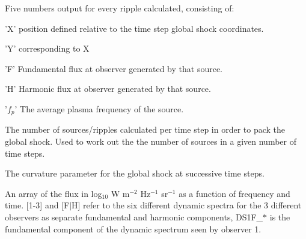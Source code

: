 \documentclass[12pt,a4paper]{article}
\begin{document}
  \setlength{\temptextwidth}{\textwidth}  
  \addtolength{\temptextwidth}{-1.0\parindent}
    
    \parbox[t]{\temptextwidth}{Five numbers output for every ripple calculated, consisting  of:
       
                               'X' position defined relative to the time step global shock  coordinates. 

                               'Y' corresponding to X 

                               'F' Fundamental flux at observer generated  by that source. 
                               
                               'H' Harmonic flux at observer generated by that source.

                               '$f_p$' The average plasma frequency of the source.}

  
   
  \setlength{\temptextwidth}{\textwidth}  
  \addtolength{\temptextwidth}{-1.0\parindent}
   
   \parbox[t]{\temptextwidth}{The number of sources/ripples calculated per time step 
                               in order to pack the global shock. Used to work out the 
                               the number of sources in a given number of time steps.}

    \vspace{0.5cm}
   
  \setlength{\temptextwidth}{\textwidth}  
  \addtolength{\temptextwidth}{-1.0\parindent}
    
    \parbox[t]{\temptextwidth}{The curvature parameter for the global shock at successive time steps.}  

    \vspace{0.5cm}
   
  \setlength{\temptextwidth}{\textwidth}   
  \addtolength{\temptextwidth}{-1.0\parindent}
    
    \parbox[t]{\temptextwidth}{An array of the flux in log$_{10}$ W m$^{-2}$ Hz$^{-1}$ sr$^{-1}$ as 
                               a function of frequency and time. [1-3] and [F$|$H] refer to the six 
                               different dynamic spectra for the 3 different observers as separate 
                               fundamental and harmonic components, \eg DS1F\_$\ast$ is the fundamental 
                               component of the dynamic spectrum seen by observer 1.}
  
\end{document}
